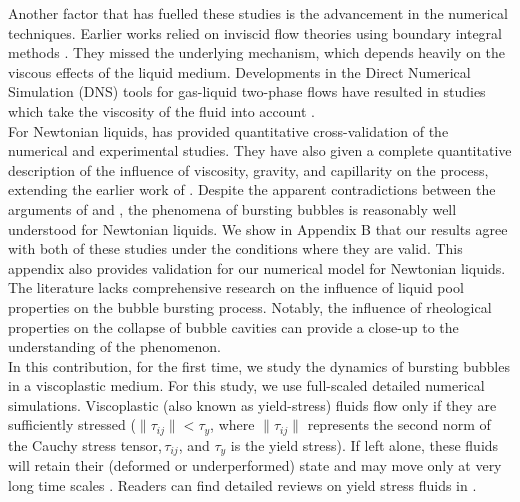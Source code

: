 \documentclass{jfm}
\begin{document}
Another factor that has fuelled these studies is the advancement in the numerical techniques. Earlier works relied on inviscid flow theories using boundary integral methods \citep{boulton1993gas,longuet1995critical}. They missed the underlying mechanism, which depends heavily on the viscous effects of the liquid medium. Developments in the Direct Numerical Simulation (DNS) tools for gas-liquid two-phase flows \citep{tryggvason2011direct, popinet2003gerris, popinet2009accurate} have resulted in studies which take the viscosity of the fluid into account \citep{walls2015jet}.\\
For Newtonian liquids, \cite{deike2018dynamics} has provided quantitative cross-validation of the numerical and experimental studies. They have also given a complete quantitative description of the influence of viscosity, gravity, and capillarity on the process, extending the earlier work of \cite{duchemin2002jet}. Despite the apparent contradictions between the arguments of \cite{gordillo2019capillary} and \cite{ganan2017revision}, the phenomena of bursting bubbles is reasonably well understood for Newtonian liquids. We show in Appendix B that our results agree with both of these studies under the conditions where they are valid. This appendix also provides validation for our numerical model for Newtonian liquids. The literature lacks comprehensive research on the influence of liquid pool properties on the bubble bursting process. Notably, the influence of rheological properties on the collapse of bubble cavities can provide a close-up to the understanding of the phenomenon.\\%
In this contribution, for the first time, we study the dynamics of bursting bubbles in a viscoplastic medium. For this study, we use full-scaled detailed numerical simulations. Viscoplastic (also known as yield-stress) fluids flow only if they are sufficiently stressed ($\|\tau_{ij}\| < \tau_y$, where $\|\tau_{ij}\|$ represents the second norm of the Cauchy stress tensor,$\,\tau_{ij}$, and $\tau_y$ is the yield stress). If left alone, these fluids will retain their (deformed or underperformed) state and may move only at very long time scales \citep{barnes1999yield}. Readers can find detailed reviews on yield stress fluids in \cite{bird1983rheology,coussot2014yield,balmforth2014yielding}. \\
\end{document}

